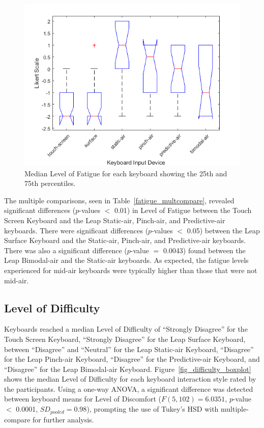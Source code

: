 \begin{figure}[!t]
	\centering
	\includegraphics{Figures/fig_fatigue_boxplot}
	\caption[Level of Fatigue Boxplot]{Median Level of Fatigue for each keyboard showing the 25th and 75th percentiles.}
	\label{fig_fatigue_boxplot}
\end{figure}

The multiple comparisons, seen in Table~\ref{fatigue_multcompare}, revealed significant differences ($p$-values $<$ 0.01) in Level of Fatigue between the Touch Screen Keyboard and the Leap Static-air, Pinch-air, and Predictive-air keyboards. There were significant differences ($p$-values $<$ 0.05) between the Leap Surface Keyboard and the Static-air, Pinch-air, and Predictive-air keyboards. There was also a significant difference ($p$-value $=$ 0.0043) found between the Leap Bimodal-air and the Static-air keyboards. As expected, the fatigue levels experienced for mid-air keyboards were typically higher than those that were not mid-air.

\subsection{Level of Difficulty}
Keyboards reached a median Level of Difficulty of ``Strongly Disagree'' for the Touch Screen Keyboard, ``Strongly Disagree'' for the Leap Surface Keyboard, between ``Disagree'' and ``Neutral'' for the Leap Static-air Keyboard, ``Disagree'' for the Leap Pinch-air Keyboard, ``Disagree'' for the Predictive-air Keyboard, and ``Disagree'' for the Leap Bimodal-air Keyboard. Figure~\ref{fig_difficulty_boxplot} shows the median Level of Difficulty for each keyboard interaction style rated by the participants. Using a one-way ANOVA, a significant difference was detected between keyboard means for Level of Discomfort ($F(5, 102) = 6.0351$, $p$-value $<$ 0.0001, $SD_{pooled} = 0.98$), prompting the use of Tukey's HSD with multiple-compare for further analysis.

